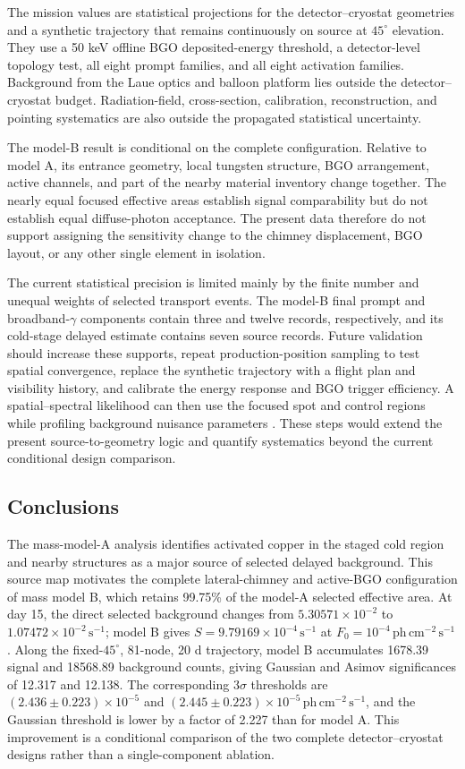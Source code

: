 \documentclass[11pt]{article}
\newcommand{\phcms}{\ensuremath{\,\mathrm{ph\,cm^{-2}\,s^{-1}}}}
\newcommand{\cps}{\ensuremath{\,\mathrm{s^{-1}}}}
\begin{document}
The mission values are statistical projections for the detector--cryostat
geometries and a synthetic trajectory that remains continuously on source at
$45^\circ$ elevation. They use a 50 keV offline BGO deposited-energy threshold,
a detector-level topology test, all eight prompt families, and all eight
activation families. Background from the Laue optics and balloon platform lies
outside the detector--cryostat budget. Radiation-field, cross-section,
calibration, reconstruction, and pointing systematics are also outside the
propagated statistical uncertainty.

The model-B result is conditional on the complete configuration. Relative to
model A, its entrance geometry, local tungsten structure, BGO arrangement,
active channels, and part of the nearby material inventory change together.
The nearly equal focused effective areas establish signal comparability but do
not establish equal diffuse-photon acceptance. The present data therefore do
not support assigning the sensitivity change to the chimney displacement, BGO
layout, or any other single element in isolation.

The current statistical precision is limited mainly by the finite number and
unequal weights of selected transport events. The model-B final prompt and
broadband-$\gamma$ components contain three and twelve records, respectively,
and its cold-stage delayed estimate contains seven source records. Future
validation should increase these supports, repeat production-position sampling
to test spatial convergence, replace the synthetic trajectory with a flight
plan and visibility history, and calibrate the energy response and BGO trigger
efficiency. A spatial--spectral likelihood can then use the focused spot and
control regions while profiling background nuisance parameters
\cite{Cowan2011}. These steps would extend the present source-to-geometry logic
and quantify systematics beyond the current conditional design comparison.

\subsection{Conclusions}
\label{sec:conclusions}

The mass-model-A analysis identifies activated copper in the staged cold region
and nearby structures as a major source of selected delayed background. This
source map motivates the complete lateral-chimney and active-BGO configuration
of mass model B, which retains 99.75\% of the model-A selected effective area.
At day 15, the direct selected background changes from
$5.30571\times10^{-2}$ to $1.07472\times10^{-2}\cps$; model B gives
$S=9.79169\times10^{-4}\cps$ at $F_0=10^{-4}\phcms$. Along the fixed-$45^\circ$,
81-node, 20 d trajectory, model B accumulates 1678.39 signal and 18568.89
background counts, giving Gaussian and Asimov significances of 12.317 and
12.138. The corresponding $3\sigma$ thresholds are
$(2.436\pm0.223)\times10^{-5}$ and
$(2.445\pm0.223)\times10^{-5}\phcms$, and the Gaussian threshold is lower by a
factor of 2.227 than for model A. This improvement is a conditional comparison
of the two complete detector--cryostat designs rather than a single-component
ablation.
\end{document}
